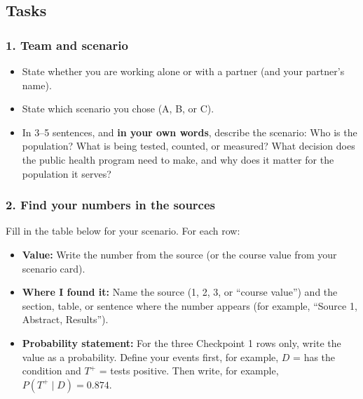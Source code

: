\documentclass[
  letterpaper,
  DIV=11,
  numbers=noendperiod]{scrartcl}
\providecommand{\tightlist}{%
  \setlength{\itemsep}{0pt}\setlength{\parskip}{0pt}}
\begin{document}
\subsection{Tasks}\label{tasks}

\subsubsection{1. Team and scenario}\label{team-and-scenario}

\begin{itemize}
\tightlist
\item
  State whether you are working alone or with a partner (and your
  partner's name).
\item
  State which scenario you chose (A, B, or C).
\item
  In 3--5 sentences, and \textbf{in your own words}, describe the
  scenario: Who is the population? What is being tested, counted, or
  measured? What decision does the public health program need to make,
  and why does it matter for the population it serves?
\end{itemize}

\subsubsection{2. Find your numbers in the
sources}\label{find-your-numbers-in-the-sources}

Fill in the table below for your scenario. For each row:

\begin{itemize}
\tightlist
\item
  \textbf{Value:} Write the number from the source (or the course value
  from your scenario card).
\item
  \textbf{Where I found it:} Name the source (1, 2, 3, or ``course
  value'') and the section, table, or sentence where the number appears
  (for example, ``Source 1, Abstract, Results'').
\item
  \textbf{Probability statement:} For the three Checkpoint 1 rows only,
  write the value as a probability. Define your events first, for
  example, \(D\) = has the condition and \(T^+\) = tests positive. Then
  write, for example, \(P(T^+ \mid D) = 0.874\).
\end{itemize}
\end{document}
